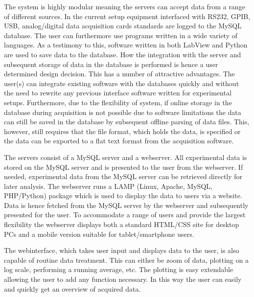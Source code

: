 The system is highly modular meaning the servers can accept data from a range
of different sources. In the current setup equipment interfaced with RS232,
GPIB, USB, analog/digital data acquisition cards standards are logged to the
MySQL database. The user can furthermore use programs written in a wide variety
of languages. As a testimony to this, software written in both LabView and
Python are used to save data to the database. How the integration with the
server and subsequent storage of data in the database is performed is hence a
user determined design decision. This has a number of attractive advantages.
The user(s) can integrate existing software with the databases quickly and
without the need to rewrite any previous interface software written for
experimental setups. Furthermore, due to the flexibility of system, if online
storage in the database during acquisition is not possible due to software
limitations the data can still be saved in the database by subsequent offline
parsing of data files. This, however, still requires that the file format,
which holds the data, is specified or the data can be exported to a flat text
format from the acquisition software. 

The servers consist of a MySQL server and a webserver. All experimental data is
stored on the MySQL server and is presented to the user from the webserver. If
needed, experimental data from the MySQL server can be retrieved directly for
later analysis. The webserver runs a LAMP (Linux, Apache, MySQL,
PHP/Python) package which is used to display the data to users via
a website. Data is hence fetched from the MySQL server by the webserver and
subsequently presented for the user. To accommodate a range of users and
provide the largest flexibility the webserver displays both a standard HTML/CSS
site for desktop PCs and a mobile version suitable for tablet/smartphone users.

The webinterface, which takes user input and displays data to the user, is
also capable of routine data treatment. This can either be zoom of data,
plotting on a log scale, performing a running average, etc. The plotting is
easy extendable allowing the user to add any function necessary. In this way
the user can easily and quickly get an overview of acquired data.
